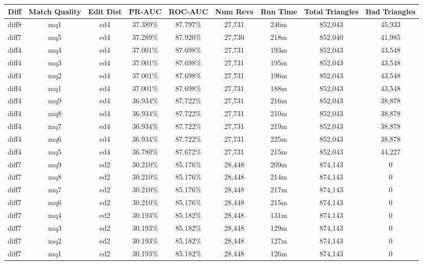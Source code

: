 \begin{sidewaystable}[!ph]
  \begin{center}
    \begin{tabular}{|c|c|c||c|c||c|c|c|c|}
\hline
Diff & Match Quality & Edit Dist
        & PR-AUC & ROC-AUC
        & Num Revs & Run Time
        & Total Triangles & Bad Triangles \\
\hline
\hline
diff8 & mq1 & ed4 & 37.389\% & 87.797\% & 27,731 & 246m & 852,043 & 45,933 \\
diff7 & mq5 & ed4 & 37.289\% & 87.920\% & 27,730 & 218m & 852,040 & 41,985 \\
diff4 & mq4 & ed4 & 37.001\% & 87.698\% & 27,731 & 193m & 852,043 & 43,548 \\
diff4 & mq3 & ed4 & 37.001\% & 87.698\% & 27,731 & 195m & 852,043 & 43,548 \\
diff4 & mq2 & ed4 & 37.001\% & 87.698\% & 27,731 & 196m & 852,043 & 43,548 \\
diff4 & mq1 & ed4 & 37.001\% & 87.698\% & 27,731 & 188m & 852,043 & 43,548 \\
diff4 & mq9 & ed4 & 36.934\% & 87.722\% & 27,731 & 216m & 852,043 & 38,878 \\
diff4 & mq8 & ed4 & 36.934\% & 87.722\% & 27,731 & 210m & 852,043 & 38,878 \\
diff4 & mq7 & ed4 & 36.934\% & 87.722\% & 27,731 & 219m & 852,043 & 38,878 \\
diff4 & mq6 & ed4 & 36.934\% & 87.722\% & 27,731 & 225m & 852,043 & 38,878 \\
diff4 & mq5 & ed4 & 36.780\% & 87.672\% & 27,731 & 215m & 852,043 & 44,227 \\
diff7 & mq9 & ed2 & 30.210\% & 85.176\% & 28,448 & 209m & 874,143 & 0 \\
diff7 & mq8 & ed2 & 30.210\% & 85.176\% & 28,448 & 214m & 874,143 & 0 \\
diff7 & mq7 & ed2 & 30.210\% & 85.176\% & 28,448 & 217m & 874,143 & 0 \\
diff7 & mq6 & ed2 & 30.210\% & 85.176\% & 28,448 & 215m & 874,143 & 0 \\
diff7 & mq4 & ed2 & 30.193\% & 85.182\% & 28,448 & 131m & 874,143 & 0 \\
diff7 & mq3 & ed2 & 30.193\% & 85.182\% & 28,448 & 129m & 874,143 & 0 \\
diff7 & mq2 & ed2 & 30.193\% & 85.182\% & 28,448 & 127m & 874,143 & 0 \\
diff7 & mq1 & ed2 & 30.193\% & 85.182\% & 28,448 & 126m & 874,143 & 0 \\

\end{tabular}
\end{center}
\end{sidewaystable}
